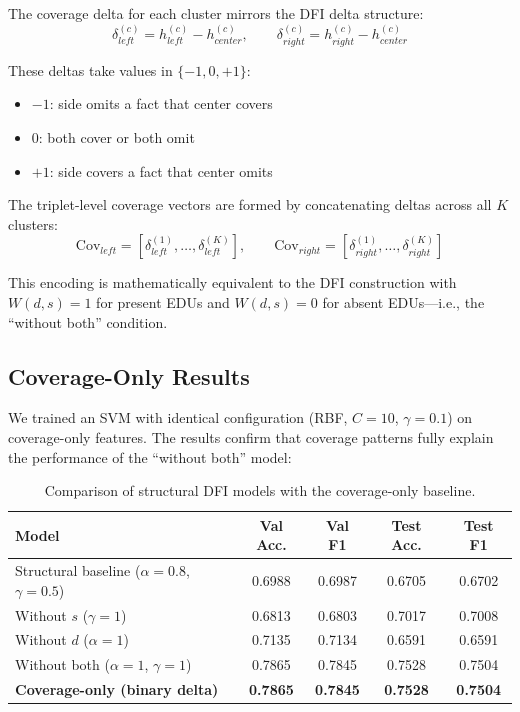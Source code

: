 \documentclass[12pt,a4paper]{article}
\begin{document}
The coverage delta for each cluster mirrors the DFI delta structure:
\[
\delta^{(c)}_{left} = h^{(c)}_{left} - h^{(c)}_{center}, \qquad
\delta^{(c)}_{right} = h^{(c)}_{right} - h^{(c)}_{center}
\]

These deltas take values in $\{-1, 0, +1\}$:
\begin{itemize}
\item $-1$: side omits a fact that center covers
\item $0$: both cover or both omit
\item $+1$: side covers a fact that center omits
\end{itemize}

The triplet-level coverage vectors are formed by concatenating deltas across all $K$ clusters:
\[
\mathrm{Cov}_{left} = [\delta^{(1)}_{left}, \ldots, \delta^{(K)}_{left}], \qquad
\mathrm{Cov}_{right} = [\delta^{(1)}_{right}, \ldots, \delta^{(K)}_{right}]
\]

This encoding is mathematically equivalent to the DFI construction with $W(d,s) = 1$ for present EDUs
and $W(d,s) = 0$ for absent EDUs---i.e., the ``without both'' condition.

\subsection{Coverage-Only Results}

We trained an SVM with identical configuration (RBF, $C=10$, $\gamma=0.1$) on coverage-only features.
The results confirm that coverage patterns fully explain the performance of the ``without both'' model:

\begin{table}[h]
\centering
\begin{tabular}{lcccc}
\hline
\textbf{Model} & \textbf{Val Acc.} & \textbf{Val F1} & \textbf{Test Acc.} & \textbf{Test F1} \\
\hline
Structural baseline ($\alpha=0.8$, $\gamma=0.5$) & 0.6988 & 0.6987 & 0.6705 & 0.6702 \\
Without $s$ ($\gamma=1$) & 0.6813 & 0.6803 & 0.7017 & 0.7008 \\
Without $d$ ($\alpha=1$) & 0.7135 & 0.7134 & 0.6591 & 0.6591 \\
Without both ($\alpha=1$, $\gamma=1$) & 0.7865 & 0.7845 & 0.7528 & 0.7504 \\
\textbf{Coverage-only (binary delta)} & \textbf{0.7865} & \textbf{0.7845} & \textbf{0.7528} & \textbf{0.7504} \\
\hline
\end{tabular}
\caption{Comparison of structural DFI models with the coverage-only baseline.}
\label{tab:coverage_comparison}
\end{table}
\end{document}
